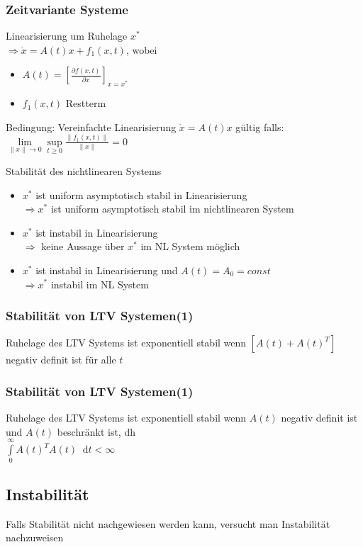 \documentclass[6pt,a4paper,fleqn]{scrartcl}
\newcommand*\diff{\mathop{}\!\mathrm{d}}
\begin{document}
\begin{multicols*}{4}
\subsubsection*{Zeitvariante Systeme}
Linearisierung um Ruhelage $x^*$ \\
$\Rightarrow \dot{x} = A(t) x + f_1(x,t)$, wobei \\
\begin{itemize}
  \item $A(t) = \left[ \frac{\partial f(x,t)}{\partial x} \right]_{x=x^*}$
  \item $f_1(x,t)$ Restterm
\end{itemize}

Bedingung: Vereinfachte Linearisierung $\dot{x}  = A(t) x$ gültig falls: \\
$\lim\limits_{\|x\| \rightarrow 0} \sup\limits_{t \geq 0} \frac{\|f_1(x,t)\|}{\|x\|} = 0$

Stabilität des nichtlinearen Systems
\begin{itemize}
  \item $x^*$ ist uniform asymptotisch stabil in Linearisierung \\
    $\Rightarrow x^*$ ist uniform asymptotisch stabil im nichtlinearen System
  \item $x^*$ ist instabil in Linearisierung \\
    $\Rightarrow$ keine Aussage über $x^*$ im NL System möglich
  \item $x^*$ ist instabil in Linearisierung und $A(t) = A_0 = const$ \\
    $\Rightarrow x^*$ instabil im NL System
\end{itemize}

\subsubsection*{Stabilität von LTV Systemen(1)}
Ruhelage des LTV Systems ist exponentiell stabil wenn $\left[ A(t) + A(t)^T \right]$ negativ definit ist für alle $t$

\subsubsection*{Stabilität von LTV Systemen(1)}
Ruhelage des LTV Systems ist exponentiell stabil wenn $A(t)$ negativ definit ist und $A(t)$ beschränkt ist, dh \\
$\int\limits_{0}^{\infty}A(t)^T A(t) \diff t < \infty$

\subsection{Instabilität}
Falls Stabilität nicht nachgewiesen werden kann, versucht man Instabilität nachzuweisen


\end{multicols*}
\end{document}
